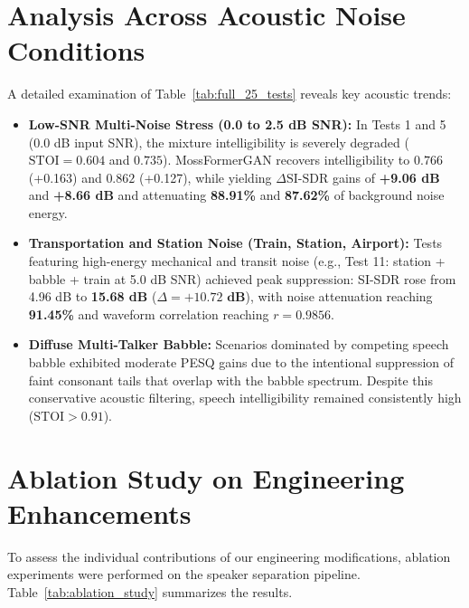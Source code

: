 \documentclass[11pt,a4paper]{report}
\begin{document}
\section{Analysis Across Acoustic Noise Conditions}
A detailed examination of Table~\ref{tab:full_25_tests} reveals key acoustic trends:
\begin{itemize}
    \item \textbf{Low-SNR Multi-Noise Stress (0.0 to 2.5 dB SNR):} In Tests 1 and 5 (0.0 dB input SNR), the mixture intelligibility is severely degraded ($\text{STOI} = 0.604$ and $0.735$). MossFormerGAN recovers intelligibility to $0.766$ (+0.163) and $0.862$ (+0.127), while yielding $\Delta\text{SI-SDR}$ gains of \textbf{+9.06 dB} and \textbf{+8.66 dB} and attenuating \textbf{88.91\%} and \textbf{87.62\%} of background noise energy.
    \item \textbf{Transportation and Station Noise (Train, Station, Airport):} Tests featuring high-energy mechanical and transit noise (e.g., Test 11: station + babble + train at 5.0 dB SNR) achieved peak suppression: SI-SDR rose from 4.96 dB to \textbf{15.68 dB} ($\Delta = \mathbf{+10.72\text{ dB}}$), with noise attenuation reaching \textbf{91.45\%} and waveform correlation reaching $r = 0.9856$.
    \item \textbf{Diffuse Multi-Talker Babble:} Scenarios dominated by competing speech babble exhibited moderate PESQ gains due to the intentional suppression of faint consonant tails that overlap with the babble spectrum. Despite this conservative acoustic filtering, speech intelligibility remained consistently high ($\text{STOI} > 0.91$).
\end{itemize}

\section{Ablation Study on Engineering Enhancements}
To assess the individual contributions of our engineering modifications, ablation experiments were performed on the speaker separation pipeline. Table~\ref{tab:ablation_study} summarizes the results.
\end{document}
